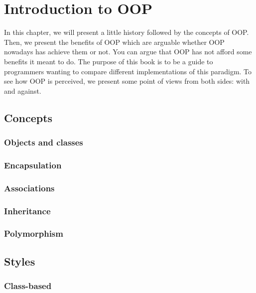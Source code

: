 \documentclass[12pt]{book}
\begin{document}
		\chapter{Introduction to OOP}
\fi

\begin{introduction}
	In this chapter, we will present a little history followed by the concepts of OOP.
	Then, we present the benefits of OOP which are arguable whether OOP nowadays has achieve them or not. 
	You can argue that OOP has not afford some benefits it meant to do. 
	The purpose of this book is to be a guide to programmers wanting to compare different implementations of this paradigm. 
	To see how OOP is perceived, we present some point of views from both sides: with and against.
\end{introduction}


\section{Concepts}

\subsection{Objects and classes}

\subsection{Encapsulation}

\subsection{Associations}

\subsection{Inheritance}

\subsection{Polymorphism}


\section{Styles}

\subsection{Class-based}
\end{document}
